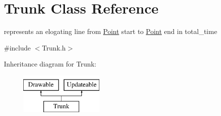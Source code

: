 \hypertarget{class_trunk}{}\section{Trunk Class Reference}
\label{class_trunk}


represents an elogating line from \mbox{\hyperlink{struct_point}{Point}} start to \mbox{\hyperlink{struct_point}{Point}} end in total\+\_\+time  




{\ttfamily \#include $<$Trunk.\+h$>$}

Inheritance diagram for Trunk\+:\begin{figure}[H]
\begin{center}
\leavevmode
\includegraphics[height=2.000000cm]{class_trunk}
\end{center}
\end{figure}
